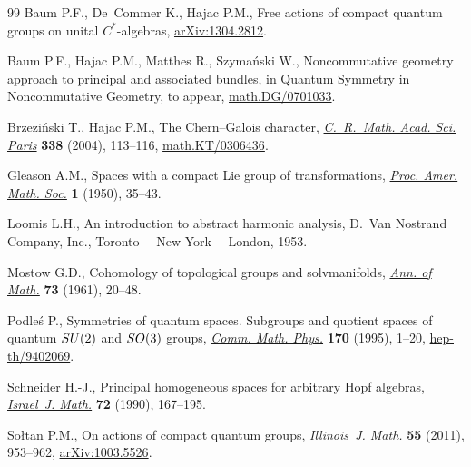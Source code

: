 \documentclass[11pt]{article}
\begin{document}
\begin{thebibliography}{99}
Baum P.F., De~Commer K., Hajac P.M., Free actions of compact quantum groups on
  unital $C^{*}$-algebras, \href{http://arxiv.org/abs/1304.2812}{arXiv:1304.2812}.

Baum P.F., Hajac P.M., Matthes R., Szyma\'nski W., Noncommutative geometry
  approach to principal and associated bundles, in Quantum Symmetry in
  Noncommutative Geometry, {t}o appear, \href{http://arxiv.org/abs/math.DG/0701033}{math.DG/0701033}.

Brzezi{\'n}ski T., Hajac P.M., The {C}hern--{G}alois character,
  \href{http://dx.doi.org/10.1016/j.crma.2003.11.009}{\textit{C.~R.~Math. Acad. Sci. Paris}} \textbf{338} (2004), 113--116,
  \href{http://arxiv.org/abs/math.KT/0306436}{math.KT/0306436}.

Gleason A.M., Spaces with a compact {L}ie group of transformations,
  \href{http://dx.doi.org/10.1090/S0002-9939-1950-0033830-7}{\textit{Proc. Amer. Math. Soc.}} \textbf{1} (1950), 35--43.

Loomis L.H., An introduction to abstract harmonic analysis, D.~Van Nostrand
  Company, Inc., Toronto~-- New York~-- London, 1953.

Mostow G.D., Cohomology of topological groups and solvmanifolds, \href{http://dx.doi.org/10.2307/1970281}{\textit{Ann.
  of Math.}} \textbf{73} (1961), 20--48.

Podle{\'s} P., Symmetries of quantum spaces. {S}ubgroups and quotient spaces of
  quantum {${\rm SU}(2)$} and {${\rm SO}(3)$} groups, \href{http://dx.doi.org/10.1007/BF02099436}{\textit{Comm. Math.
  Phys.}} \textbf{170} (1995), 1--20, \href{http://arxiv.org/abs/hep-th/9402069}{hep-th/9402069}.

Schneider H.-J., Principal homogeneous spaces for arbitrary {H}opf algebras,
  \href{http://dx.doi.org/10.1007/BF02764619}{\textit{Israel~J. Math.}} \textbf{72} (1990), 167--195.

So{\l}tan P.M., On actions of compact quantum groups, \textit{Illinois~J.
  Math.} \textbf{55} (2011), 953--962, \href{http://arxiv.org/abs/1003.5526}{arXiv:1003.5526}.

\end{thebibliography}
\end{document}

